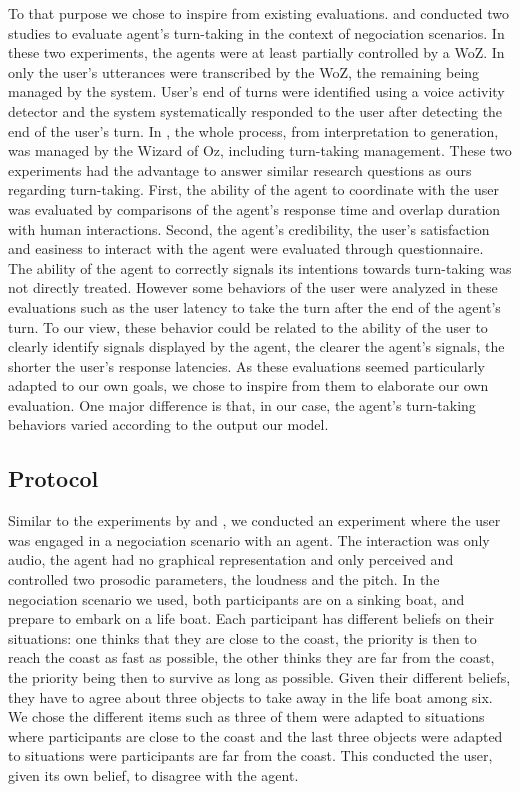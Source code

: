 To that purpose we chose to inspire from existing evaluations.
\cite{skantze_towards_2010} and \cite{de_vault_toward_2015} conducted two studies to evaluate agent's turn-taking in the context of negociation scenarios. In these two experiments, the agents were at least partially controlled by a WoZ. In \cite{skantze_towards_2010} only the user's utterances were transcribed by the WoZ, the remaining being managed by the system. User's end of turns were identified using a voice activity detector and the system systematically responded to the user after detecting the end of the user's turn. In \cite{de_vault_toward_2015}, the whole process, from interpretation to generation, was managed by the Wizard of Oz, including turn-taking management. These two experiments had the advantage to answer similar research questions as ours regarding turn-taking. First, the ability of the agent to coordinate with the user was evaluated by comparisons of the agent's response time and overlap duration with human interactions. Second, the agent's credibility, the user's satisfaction and easiness to interact with the agent were evaluated through questionnaire. The ability of the agent to correctly signals its intentions towards turn-taking was not directly treated. However some behaviors of the user were analyzed in these evaluations such as the user latency to take the turn after the end of the agent's turn. To our view, these behavior could be related to the ability of the user to clearly identify signals displayed by the agent, the clearer the agent's signals, the shorter the user's response latencies. As these evaluations seemed particularly adapted to our own goals, we chose to inspire from them to elaborate our own evaluation. One major difference is that, in our case, the agent's turn-taking behaviors varied according to the output our model. 

\subsection{Protocol}

Similar to the experiments by \cite{de_vault_toward_2015} and \citep{skantze_towards_2010}, we conducted an experiment where the user was engaged in a negociation scenario with an agent. The interaction was only audio, the agent had no graphical representation and only perceived and controlled two prosodic parameters, the loudness and the pitch. 
In the negociation scenario we used, both participants are on a sinking boat, and prepare to embark on a life boat. Each participant has different beliefs on their situations: one thinks that they are close to the coast, the priority is then to reach the coast as fast as possible, the other thinks they are far from the coast, the priority being then to survive as long as possible. Given their different beliefs, they have to agree about three objects to take away in the life boat among six. We chose the different items such as three of them were adapted to situations where participants are close to the coast and the last three objects were adapted to situations were participants are far from the coast. This conducted the user, given its own belief, to disagree with the agent.   


